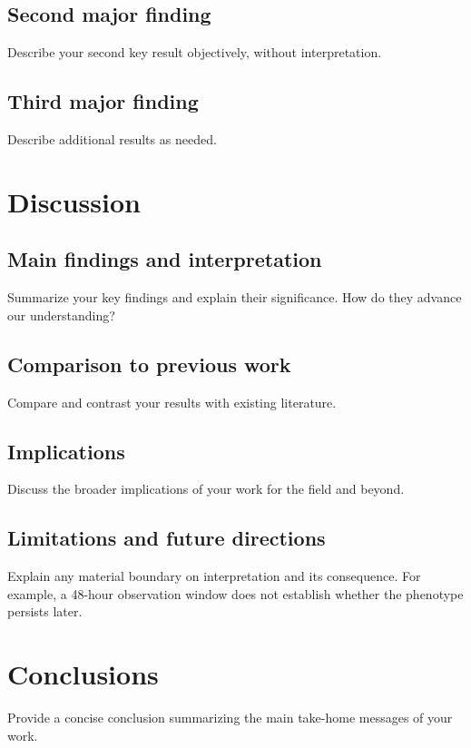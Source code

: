 \documentclass[12pt]{article}
\begin{document}
\subsection*{Second major finding}
Describe your second key result objectively, without interpretation.

\subsection*{Third major finding}
Describe additional results as needed.

\section*{Discussion}

\subsection*{Main findings and interpretation}
Summarize your key findings and explain their significance. How do they advance our understanding?

\subsection*{Comparison to previous work}
Compare and contrast your results with existing literature\cite{example2023}.

\subsection*{Implications}
Discuss the broader implications of your work for the field and beyond.

\subsection*{Limitations and future directions}
Explain any material boundary on interpretation and its consequence. For example, a 48-hour observation window does not establish whether the phenotype persists later.

\section*{Conclusions}
Provide a concise conclusion summarizing the main take-home messages of your work.
\end{document}
